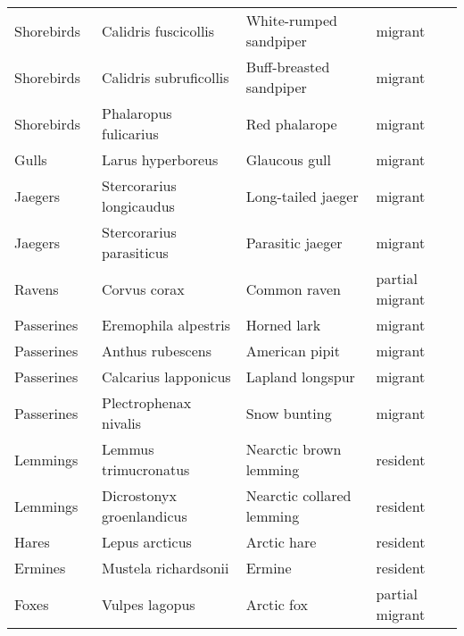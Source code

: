 \begin{table}[ht]
\begin{tabularx}{0.95\textwidth}{llll}
  Shorebirds  & Calidris fuscicollis & White-rumped sandpiper & migrant \\ 
  Shorebirds  & Calidris subruficollis & Buff-breasted sandpiper & migrant \\ 
  Shorebirds  & Phalaropus fulicarius & Red phalarope & migrant \\ 
  Gulls  & Larus hyperboreus & Glaucous gull & migrant \\ 
  Jaegers  & Stercorarius longicaudus & Long-tailed jaeger & migrant \\ 
  Jaegers  & Stercorarius parasiticus & Parasitic jaeger & migrant \\ 
  Ravens  & Corvus corax & Common raven & partial migrant \\ 
  Passerines & Eremophila alpestris & Horned lark & migrant \\ 
  Passerines & Anthus rubescens & American pipit & migrant \\ 
  Passerines & Calcarius lapponicus & Lapland longspur & migrant \\ 
  Passerines & Plectrophenax nivalis & Snow bunting & migrant \\ 
  Lemmings  & Lemmus trimucronatus & Nearctic brown lemming & resident \\ 
  Lemmings  & Dicrostonyx groenlandicus & Nearctic collared lemming & resident \\ 
  Hares  & Lepus arcticus & Arctic hare & resident \\ 
  Ermines  & Mustela richardsonii & Ermine & resident \\ 
  Foxes  & Vulpes lagopus & Arctic fox & partial migrant \\ 
   \hline
\end{tabularx}
\endgroup
\end{table}
